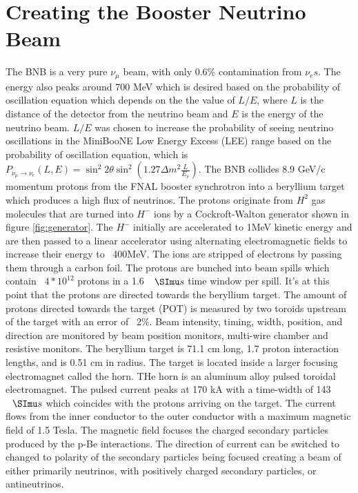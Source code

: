 \section{Creating the Booster Neutrino Beam}
The BNB is a very pure $\nu_{\mu}$ beam, with only 0.6\% contamination from $\nu_{e}s$. The energy also peaks around 700 MeV which is desired based on the probability of oscillation equation which depends on the the value of $L/E$, where $L$ is the distance of the detector from the neutrino beam and $E$ is the energy of the neutrino beam. $L/E$ was chosen to increase the probability of seeing neutrino oscillations in the MiniBooNE Low Energy Excess (LEE) range based on the probability of oscillation equation, which is $ P_{\nu_{\mu}\rightarrow \nu_{e}}\left(L,E\right) = \sin^2 2\theta \sin^2 \left(1.27\Delta m^2 \frac{L}{E_{\nu}}\right)$. The BNB collides 8.9 GeV/c momentum protons from the FNAL booster synchrotron into a beryllium target which produces a high flux of neutrinos. The protons originate from $H^2$ gas molecules that are turned into $H^-$ ions by a Cockroft-Walton generator shown in figure \ref{fig:generator}. The $H^-$ initially are accelerated to 1MeV kinetic energy and are then passed to a linear accelerator using alternating electromagnetic fields to increase their energy to ~400MeV. The ions are stripped of electrons by passing them through a carbon foil. The protons are bunched into beam spills which contain ~$4*10^12$ protons in a 1.6 $\micro s$ time window per spill. It's at this point that the protons are directed towards the beryllium target. The amount of protons directed towards the target (POT) is measured by two toroids upstream of the target with an error of ~2$\%$. Beam intensity, timing, width, position, and direction are monitored by beam position monitors, multi-wire chamber and resistive monitors. 
The beryllium target is 71.1 cm long, 1.7 proton interaction lengths, and is 0.51 cm in radius. The target is located inside a larger focusing electromagnet called the horn. THe horn is an aluminum alloy pulsed toroidal electromagnet. The pulsed current peaks at 170 kA with a time-width of 143 $\micro s$ which coincides with the protons arriving on the target. The current flows from the inner conductor to the outer conductor with a maximum magnetic field of 1.5 Tesla. The magnetic field focuses the charged secondary particles produced by the p-Be interactions. The direction of current can be switched to changed to polarity of the secondary particles being focused creating a beam of either primarily neutrinos, with positively charged secondary particles, or antineutrinos. 


